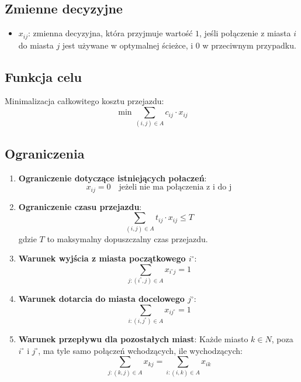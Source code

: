 \documentclass[12pt, letterpaper]{article}
\begin{document}
\subsection{Zmienne decyzyjne}
\begin{itemize}
  \item \( x_{ij} \): zmienna decyzyjna, która przyjmuje wartość \( 1 \),
        jeśli połączenie z miasta \( i \) do miasta \( j \) jest używane w
        optymalnej
        ścieżce, i \( 0 \) w przeciwnym przypadku.
\end{itemize}

\subsection{Funkcja celu}
Minimalizacja całkowitego kosztu przejazdu:
\[
  \min \sum_{(i, j) \in A} c_{ij} \cdot x_{ij}
\]

\subsection{Ograniczenia}
\begin{enumerate}
  \item \textbf{Ograniczenie dotyczące istniejących połaczeń}:
        \[
          x_{ij} = 0 \quad \text{jeżeli nie ma połączenia z i do j}
        \]
  \item \textbf{Ograniczenie czasu przejazdu}:
        \[
          \sum_{(i, j) \in A} t_{ij} \cdot x_{ij} \leq T
        \]
        gdzie \( T \) to maksymalny dopuszczalny czas przejazdu.

  \item \textbf{Warunek wyjścia z miasta początkowego \( i^\circ \)}:
        \[
          \sum_{j : (i^\circ, j) \in A} x_{i^\circ j} = 1
        \]

  \item \textbf{Warunek dotarcia do miasta docelowego \( j^\circ \)}:
        \[
          \sum_{i : (i, j^\circ) \in A} x_{ij^\circ} = 1
        \]

  \item \textbf{Warunek przepływu dla pozostałych miast}:
        Każde miasto \( k \in N \), poza \( i^\circ \) i \( j^\circ \), ma tyle
        samo połączeń wchodzących, ile wychodzących:
        \[
          \sum_{j : (k, j) \in A} x_{kj} = \sum_{i : (i, k) \in A} x_{ik}
        \]
\end{enumerate}
\end{document}
